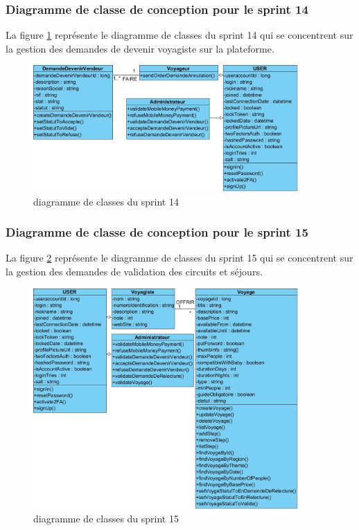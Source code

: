 \documentclass[12pt]{report}
\begin{document}
			\subsubsection{Diagramme de classe de conception pour le sprint 14}
				
			\hspace{15pt} La figure \ref{fig:sprint14} représente le diagramme de classes du sprint 14 qui se concentrent sur la gestion des demandes de devenir voyagiste sur la plateforme.


			\begin{figure}[h]
				\centering
				\includegraphics[width=0.9\textwidth]{sprint14.jpg}
				\caption{diagramme de classes du sprint 14}
				\label{fig:sprint14}
			\end{figure}
			\FloatBarrier


			\subsubsection{Diagramme de classe de conception pour le sprint 15}
				
			\hspace{15pt} La figure \ref{fig:sprint15} représente le diagramme de classes du sprint 15 qui se concentrent sur la gestion des demandes de validation des circuits et séjours.


			\begin{figure}[h]
				\centering
				\includegraphics[width=0.9\textwidth]{sprint15.jpg}
				\caption{diagramme de classes du sprint 15}
				\label{fig:sprint15}
			\end{figure}
			\FloatBarrier
\end{document}
